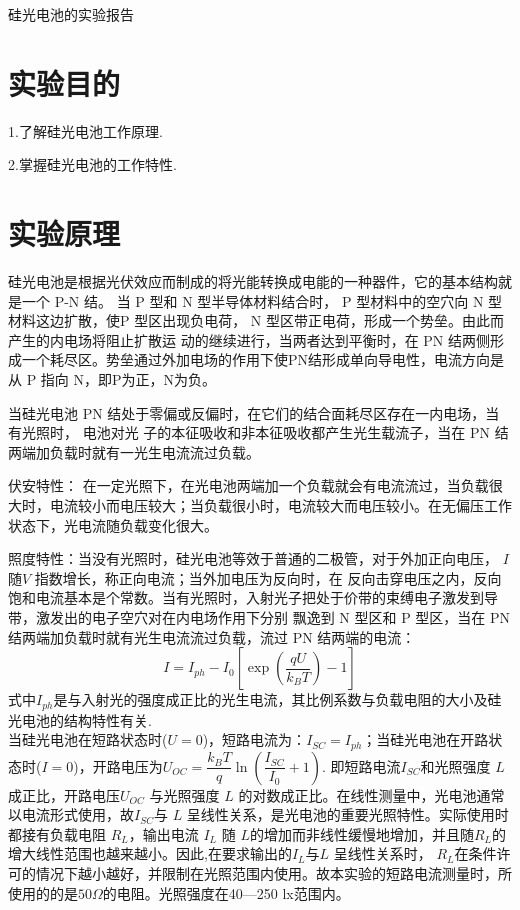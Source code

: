 \documentclass[11pt]{article}
\begin{document}
	\begin{center}
		\Large \heiti 硅光电池的实验报告
	\end{center}

\section{实验目的}
1.了解硅光电池工作原理.

2.掌握硅光电池的工作特性.
\section{实验原理}
硅光电池是根据光伏效应而制成的将光能转换成电能的一种器件，它的基本结构就是一个 P-N 结。 当 P 型和 N 型半导体材料结合时， P
型材料中的空穴向 N 型材料这边扩散，使P 型区出现负电荷， N 型区带正电荷，形成一个势垒。由此而产生的内电场将阻止扩散运
动的继续进行，当两者达到平衡时，在 PN 结两侧形成一个耗尽区。势垒通过外加电场的作用下使PN结形成单向导电性，电流方向是从 P 指向 N，即P为正，N为负。

当硅光电池 PN 结处于零偏或反偏时，在它们的结合面耗尽区存在一内电场，当有光照时， 电池对光
子的本征吸收和非本征吸收都产生光生载流子，当在 PN 结两端加负载时就有一光生电流流过负载。

\heiti 伏安特性：\songti
在一定光照下，在光电池两端加一个负载就会有电流流过，当负载很大时，电流较小而电压较大；当负载很小时，电流较大而电压较小。在无偏压工作状态下，光电流随负载变化很大。

\heiti 照度特性：\songti 当没有光照时，硅光电池等效于普通的二极管，对于外加正向电压， $ I $ 随$ V $ 指数增长，称正向电流；当外加电压为反向时，在
反向击穿电压之内，反向饱和电流基本是个常数。当有光照时，入射光子把处于价带的束缚电子激发到导带，激发出的电子空穴对在内电场作用下分别
飘逸到 N 型区和 P 型区，当在 PN 结两端加负载时就有光生电流流过负载，流过 PN 结两端的电流：
$$ I=I_{ph}-I_0\left [ \exp \left ( \dfrac{qU}{k_BT}  \right ) -1 \right ]  $$
式中$ I_{ph}  $是与入射光的强度成正比的光生电流，其比例系数与负载电阻的大小及硅光电池的结构特性有关.
\\ 当硅光电池在短路状态时($ U=0 $)，短路电流为：$ I_{SC}=I_{ph} $；当硅光电池在开路状态时($ I=0 $)，开路电压为$ U_{OC}=\dfrac{k_BT}{q}\ln \left( \dfrac{I_{SC}}{I_0} +1\right)  $. 即短路电流$ I_{SC} $和光照强度 $ L  $成正比，开路电压$ U_{OC }$ 与光照强度 $ L $ 的对数成正比。在线性测量中，光电池通常以电流形式使用，故$  I_{SC}  $与 $ L $ 呈线性关系，是光电池的重要光照特性。实际使用时都接有负载电阻 $ R_L $，输出电流 $ I_L $ 随 $ L  $的增加而非线性缓慢地增加，并且随$  R_L $的增大线性范围也越来越小。因此,在要求输出的$  I_L  $与$  L $ 呈线性关系时， $ R_L $在条件许可的情况下越小越好，并限制在光照范围内使用。故本实验的短路电流测量时，所使用的的是$ 50\Omega $的电阻。光照强度在40—250 lx范围内。
\end{document}
